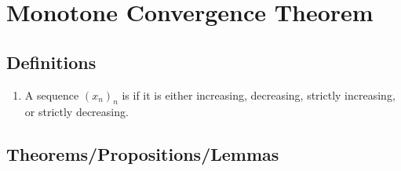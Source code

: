 \chapter*{Monotone Convergence Theorem}
\vspace{12pt}

\section*{Definitions}
   \begin{enumerate}[label = (\arabic*)]
    \item A sequence $(x_n)_n$ is  if it is either increasing, decreasing, strictly increasing, or strictly decreasing.
   \end{enumerate}

\section*{Theorems/Propositions/Lemmas}
